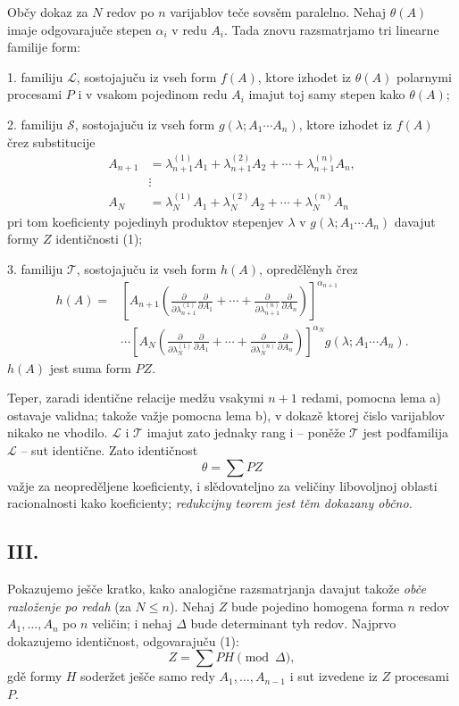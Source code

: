 \documentclass[11pt]{article}
\providecommand{\vdotswithin}[1]{\mathrel{\vdots}}
\begin{document}
Občy dokaz za $N$ redov po $n$ varijablov teče sovsěm paralelno. Nehaj $\theta(A)$ imaje odgovarajuče stepen $\alpha_i$ v redu $A_i$. Tada znovu razsmatrjamo tri linearne familije form:

1. familiju $\mathcal L$, sostojajuču iz vseh form $f(A)$, ktore izhodet iz $\theta(A)$ polarnymi procesami $P$ i v vsakom pojedinom redu $A_i$ imajut toj samy stepen kako $\theta(A)$;

2. familiju $\mathcal S$, sostojajuču iz vseh form $g(\lambda;A_1\cdots A_n)$, ktore izhodet iz $f(A)$ črez substitucije
\[
\begin{aligned}
 A_{n+1}&=\lambda_{n+1}^{(1)}A_1+\lambda_{n+1}^{(2)}A_2+
        \cdots+\lambda_{n+1}^{(n)}A_n,\\
 &\vdotswithin{=}\\
 A_N&=\lambda_N^{(1)}A_1+\lambda_N^{(2)}A_2+
        \cdots+\lambda_N^{(n)}A_n
\end{aligned}
\]
pri tom koeficienty pojedinyh produktov stepenjev $\lambda$ v $g(\lambda;A_1\cdots A_n)$ davajut formy $Z$ identičnosti (1);

3. familiju $\mathcal T$, sostojajuču iz vseh form $h(A)$, opredělěnyh črez
\[
\begin{aligned}
 h(A)=&\left[A_{n+1}\left(
 \frac{\partial}{\partial\lambda_{n+1}^{(1)}}\frac{\partial}{\partial A_1}
 +\cdots+
 \frac{\partial}{\partial\lambda_{n+1}^{(n)}}\frac{\partial}{\partial A_n}\right)\right]^{\alpha_{n+1}} \\
&\cdots
\left[A_N\left(
 \frac{\partial}{\partial\lambda_N^{(1)}}\frac{\partial}{\partial A_1}
 +\cdots+
 \frac{\partial}{\partial\lambda_N^{(n)}}\frac{\partial}{\partial A_n}\right)\right]^{\alpha_N}
 g(\lambda;A_1\cdots A_n).
\end{aligned}
\]
$h(A)$ jest suma form $PZ$.

Teper, zaradi identične relacije medžu vsakymi $n+1$ redami, pomocna lema a) ostavaje validna; takože važje pomocna lema b), v dokazě ktorej čislo varijablov nikako ne vhodilo. $\mathcal L$ i $\mathcal T$ imajut zato jednaky rang i -- poněže $\mathcal T$ jest podfamilija $\mathcal L$ -- sut identične. Zato identičnost
\[
  \theta=\sum PZ
\]
važje za neopreděljene koeficienty, i slědovateljno za veličiny libovoljnoj oblasti racionalnosti kako koeficienty; {\itshape redukcijny teorem jest těm dokazany občno.}

\subsection*{III.}
Pokazujemo ješče kratko, kako analogične razsmatrjanja davajut takože {\itshape obče razloženje po redah} (za $N\le n$). Nehaj $Z$ bude pojedino homogena forma $n$ redov $A_1,\ldots,A_n$ po $n$ veličin; i nehaj $\Delta$ bude determinant tyh redov. Najprvo dokazujemo identičnost, odgovarajuču (1):
\begin{equation}
  Z=\sum PH \pmod{\Delta},
\tag{2}
\end{equation}
gdě formy $H$ soderžet ješče samo redy $A_1,\ldots,A_{n-1}$ i sut izvedene iz $Z$ procesami $P$.
\end{document}
